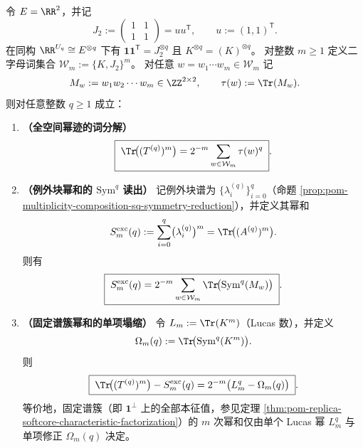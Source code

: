 \begin{theorem}\label{thm:pom-replica-softcore-word-trace-power-sums}
令 \(E=\RR^2\)，并记
\[
J_2:=\begin{pmatrix}1&1\\[2pt]1&1\end{pmatrix}
=uu^{\mathsf T},
\qquad
u:=(1,1)^{\mathsf T}.
\]
在同构 \(\RR^{U_q}\cong E^{\otimes q}\) 下有 \(\mathbf{1}\mathbf{1}^{\mathsf T}=J_2^{\otimes q}\) 且 \(K^{\otimes q}=(K)^{\otimes q}\)。
对整数 \(m\ge 1\) 定义二字母词集合 \(\mathcal{W}_m:=\{K,J_2\}^m\)。
对任意 \(w=w_1\cdots w_m\in\mathcal{W}_m\) 记
\[
M_w:=w_1w_2\cdots w_m\in\ZZ^{2\times 2},
\qquad
\tau(w):=\Tr(M_w).
\]
则对任意整数 \(q\ge 1\) 成立：
\begin{enumerate}
  \item \textbf{（全空间幂迹的词分解）}
  \begin{equation}\label{eq:pom-replica-softcore-word-trace-full}
  \boxed{\;
  \Tr\!\bigl((T^{(q)})^{m}\bigr)
  =2^{-m}\sum_{w\in\mathcal{W}_m}\tau(w)^{q}\; } .
  \end{equation}

  \item \textbf{（例外块幂和的 \(\mathrm{Sym}^q\) 读出）}
  记例外块谱为 \(\{\lambda_i^{(q)}\}_{i=0}^{q}\)（命题 \ref{prop:pom-multiplicity-composition-sq-symmetry-reduction}），并定义其幂和
  \[
  S_m^{\mathrm{exc}}(q):=\sum_{i=0}^{q}\bigl(\lambda_i^{(q)}\bigr)^{m}
  =\Tr\!\bigl((A^{(q)})^m\bigr).
  \]
  则有
  \begin{equation}\label{eq:pom-replica-softcore-word-trace-exc}
  \boxed{\;
  S_m^{\mathrm{exc}}(q)
  =2^{-m}\sum_{w\in\mathcal{W}_m}\Tr\!\bigl(\mathrm{Sym}^q(M_w)\bigr)\; } .
  \end{equation}

  \item \textbf{（固定谱簇幂和的单项塌缩）}
  令 \(L_m:=\Tr(K^m)\)（Lucas 数），并定义
  \[
  \Omega_m(q):=\Tr\!\bigl(\mathrm{Sym}^q(K^m)\bigr).
  \]
  则
  \begin{equation}\label{eq:pom-replica-softcore-word-trace-collapse}
  \boxed{\;
  \Tr\!\bigl((T^{(q)})^{m}\bigr)-S_m^{\mathrm{exc}}(q)
  =2^{-m}\bigl(L_m^{q}-\Omega_m(q)\bigr)\; } .
  \end{equation}
  等价地，固定谱簇（即 \(\mathbf{1}^\perp\) 上的全部本征值，参见定理 \ref{thm:pom-replica-softcore-characteristic-factorization}）的 \(m\) 次幂和仅由单个 Lucas 幂 \(L_m^q\) 与单项修正 \(\Omega_m(q)\) 决定。
\end{enumerate}
\end{theorem}
